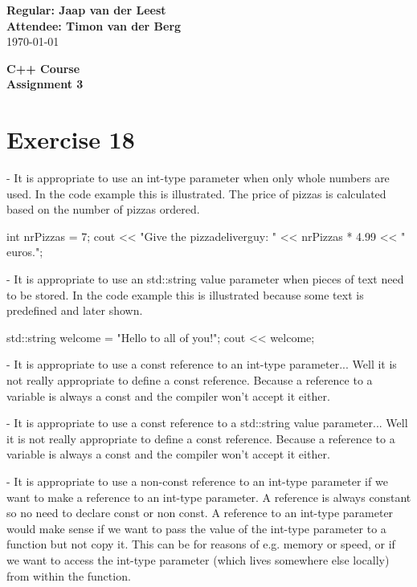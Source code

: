 \documentclass{article}[10pt]
\begin{document}
\begin{flushright}
	\textbf{Regular: Jaap van der Leest\\  Attendee: Timon van der Berg \\ }
\today
\end{flushright}

\begin{center}
\textbf{C++ Course \\
Assignment 3} \\
\end{center}
\section*{Exercise 18}

- It is appropriate to use an int-type parameter when only whole numbers are used. 
In the code example this is illustrated. The price of pizzas is calculated based on the number of pizzas ordered.
\begin{cpp}
    int nrPizzas = 7;
    cout << "Give the pizzadeliverguy: " << nrPizzas * 4.99 << " euros.\n";
\end{cpp}  
  
- It is appropriate to use an std::string value parameter when pieces of text need to be stored. 
In the code example this is illustrated because some text is predefined and later shown.
\begin{cpp}
    std::string welcome = "Hello to all of you!";
    cout << welcome;
\end{cpp}

- It is appropriate to use a const reference to an int-type parameter... Well it is not really appropriate to define a const reference. Because a reference to a variable is always a const and the compiler won't accept it either.

- It is appropriate to use a const reference to a std::string value parameter... Well it is not really appropriate to define a const reference. Because a reference to a variable is always a const and the compiler won't accept it either.


- It is appropriate to use a non-const reference to an int-type parameter if we want to make a reference to an int-type parameter. A reference is always constant so no need to declare const or non const.
A reference to an int-type parameter would make sense if we want to pass the value of the int-type parameter to a function but not copy it. This can be for reasons of e.g. memory or speed, or if we want to access the int-type parameter (which lives somewhere else locally) from within the function.
\end{document}
